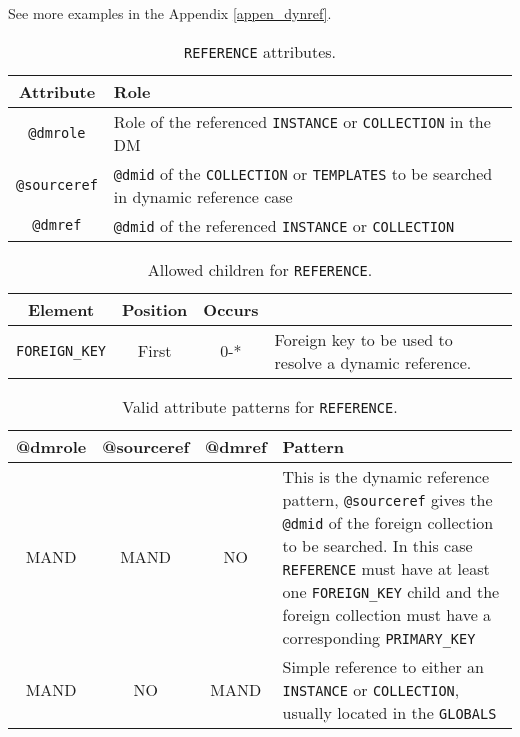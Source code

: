 See more examples in the Appendix \ref{appen_dynref}. 

\begin{table}[!htbp]
\small
\centering
\begin{tabulary}{\linewidth}{|c|J|}       
       \hline 
            \textbf{Attribute} & 
            \textbf {Role}\\
       \hline         \hline  
            \texttt{@dmrole} & 
            Role of the referenced \texttt{INSTANCE} or \texttt{COLLECTION} in the DM \\
        \hline 
            \texttt{@sourceref}  &
            \texttt{@dmid} of the \texttt{COLLECTION} or \texttt{TEMPLATES} to be searched in dynamic reference case \\
        \hline 
            \texttt{@dmref} & 
            \texttt{@dmid} of the referenced \texttt{INSTANCE} or \texttt{COLLECTION}\\
        \hline 
     \end{tabulary}
     \caption{\texttt{REFERENCE} attributes.} 
     \label{tbl:reference-att}
 \end{table}

\begin{table}[!htbp]
\small
\centering
\begin{tabulary}{\linewidth}{|c |c |c|J|}
    \hline 
        \textbf{Element} &
        \textbf{Position} &
        \textbf{Occurs} &
        \\
    \hline      \hline  
        \texttt{FOREIGN\_KEY}  &        
        First &           
        0-* &
        Foreign key to be used to resolve a dynamic reference.\\
    \hline 
\end{tabulary}
     \caption{Allowed children for \texttt{REFERENCE}.} 
     \label{tbl:reference-children}
\end{table}


\begin{table}[!htbp]
\small
\centering
\begin{tabulary}{\linewidth}{|c|c|c|J|}
    \hline 
        \textbf{@dmrole} &
        \textbf{@sourceref} &
        \textbf{@dmref} &
        \textbf{Pattern}\\
    \hline      \hline  
        MAND &           
        MAND &           
        NO &           
        This is the dynamic reference pattern, \texttt{@sourceref} gives the \texttt{@dmid} of the foreign collection to be searched. In this case \texttt{REFERENCE} must have at least one \texttt{FOREIGN\_KEY} child and the foreign collection must have a corresponding \texttt{PRIMARY\_KEY}\\
    \hline   
        MAND &           
        NO &           
        MAND &           
        Simple reference to either an \texttt{INSTANCE} or \texttt{COLLECTION}, usually located in the \texttt{GLOBALS}\\
   \hline 
\end{tabulary}
     \caption{Valid attribute patterns for  \texttt{REFERENCE}.}
     \label{tbl:reference-pattern}
\end{table}

